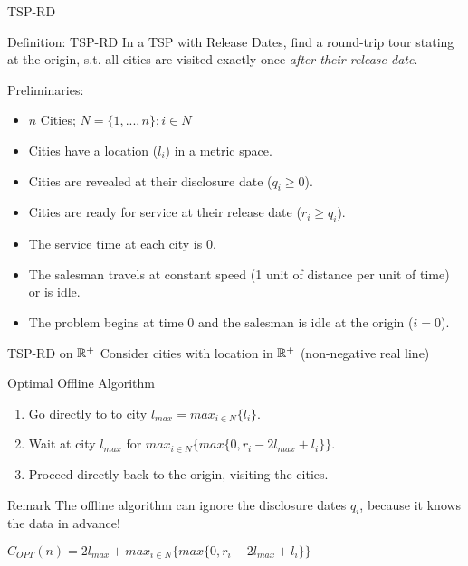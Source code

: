 \documentclass{beamer}
\begin{document}
\begin{frame}{TSP-RD}
  \begin{block}{Definition: TSP-RD}
    In a \alert{TSP with Release Dates}, find a round-trip tour stating at the origin, s.t. all cities are visited exactly once \emph{after their release date}.
  \end{block}
  Preliminaries:
  \begin{itemize}
    \item $n$ Cities; $N=\{1, ... ,n\}; i \in N $
    \item Cities have a location ($l_i$) in a metric space.
    \item Cities are revealed at their disclosure date ($q_i \ge 0$).
    \item Cities are ready for service at their release date ($r_i \ge q_i$).
    \item The service time at each city is 0.
    \item The salesman travels at constant speed (1 unit of distance per unit of time) or is idle.
    \item The problem begins at time 0 and the salesman is idle at the origin ($i=0$).
  \end{itemize}
\end{frame}

\begin{frame}{TSP-RD on $\Bbb{R}^+$}
  Consider cities with location in $\Bbb{R}^+$ (non-negative real line)

  \vspace{5pt}
  \begin{block}{Optimal Offline Algorithm}
    \begin{enumerate}
      \item Go directly to to city $l_{max} = max_{i \in N}\{l_i\}$.
      \item Wait at city $l_{max}$ for $max_{i \in N}\{max\{0,r_i - 2l_{max}+l_i\}\}$.
      \item Proceed directly back to the origin, visiting the cities.
    \end{enumerate}
  \end{block}

  \begin{block}{Remark}
    The offline algorithm can ignore the disclosure dates $q_i$, because it knows the data in advance!
  \end{block}

  $C_{OPT}(n) = 2l_{max} + max_{i \in N}\{max\{0,r_i - 2l_{max}+l_i\}\}$
\end{frame}
\end{document}
